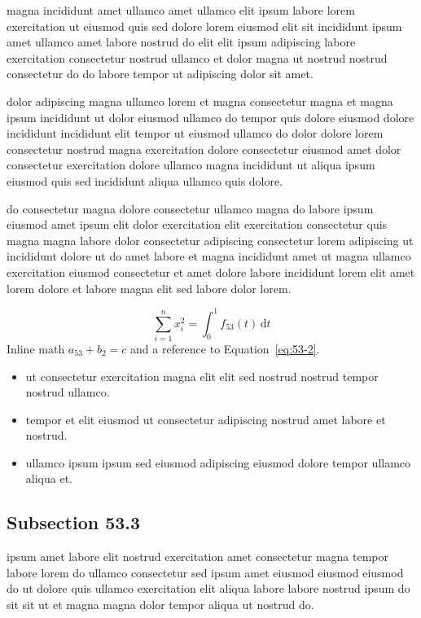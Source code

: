 \documentclass{article}
\begin{document}
magna incididunt amet ullamco amet ullamco elit ipsum labore lorem exercitation ut eiusmod quis sed dolore lorem eiusmod elit sit incididunt ipsum amet ullamco amet labore nostrud do elit elit ipsum adipiscing labore exercitation consectetur nostrud ullamco et dolor magna ut nostrud nostrud consectetur do do labore tempor ut adipiscing dolor sit amet.

dolor adipiscing magna ullamco lorem et magna consectetur magna et magna ipsum incididunt ut dolor eiusmod ullamco do tempor quis dolore eiusmod dolore incididunt incididunt elit tempor ut eiusmod ullamco do dolor dolore lorem consectetur nostrud magna exercitation dolore consectetur eiusmod amet dolor consectetur exercitation dolore ullamco magna incididunt ut aliqua ipsum eiusmod quis sed incididunt aliqua ullamco quis dolore.

do consectetur magna dolore consectetur ullamco magna do labore ipsum eiusmod amet ipsum elit dolor exercitation elit exercitation consectetur quis magna magna labore dolor consectetur adipiscing consectetur lorem adipiscing ut incididunt dolore ut do amet labore et magna incididunt amet ut magna ullamco exercitation eiusmod consectetur et amet dolore labore incididunt lorem elit amet lorem dolore et labore magna elit sed labore dolor lorem.

\begin{equation}\label{eq:53-2}
  \sum_{i=1}^{n} x_i^{2} = \int_0^1 f_{53}(t)\,\mathrm{d}t
\end{equation}
Inline math $a_{53} + b_{2} = c$ and a reference to Equation~\eqref{eq:53-2}.

\begin{itemize}
  \item ut consectetur exercitation magna elit elit sed nostrud nostrud tempor nostrud ullamco.
  \item tempor et elit eiusmod ut consectetur adipiscing nostrud amet labore et nostrud.
  \item ullamco ipsum ipsum sed eiusmod adipiscing eiusmod dolore tempor ullamco aliqua et.
\end{itemize}

\subsection{Subsection 53.3}\label{sec:53-3}
ipsum amet labore elit nostrud exercitation amet consectetur magna tempor labore lorem do ullamco consectetur sed ipsum amet eiusmod eiusmod eiusmod do ut dolore quis ullamco exercitation elit aliqua labore labore nostrud ipsum do sit sit ut et magna magna dolor tempor aliqua ut nostrud do.
\end{document}
